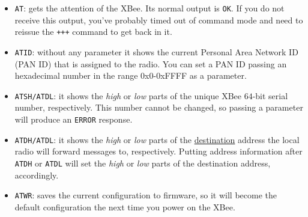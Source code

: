 \begin{itemize}
	\item \texttt{AT}: gets the attention of the XBee. Its normal output is \texttt{OK}. If you do not receive this output,  you've probably timed out of command mode and need to reissue the \texttt{+++} command to get back in it.
	\item \texttt{ATID}: without any parameter it shows the current Personal Area Network ID (PAN ID) that is assigned to the radio. You can set a PAN ID passing an hexadecimal number in the range $0$x$0$-$0$xFFFF as a parameter.
	\item \texttt{ATSH/ATDL}: it shows the \emph{high} or \emph{low} parts of the unique XBee $64$-bit serial number, respectively. This number cannot be changed, so passing a parameter will produce an \texttt{ERROR} response.
	\item \texttt{ATDH/ATDL}: it shows the \emph{high} or \emph{low} parts of the \underline{destination} address the local radio will forward messages to, respectively. Putting address information after \texttt{ATDH} or \texttt{ATDL} will set the \emph{high} or \emph{low} parts of the destination address, accordingly.
	\item \texttt{ATWR}: saves the current configuration to firmware, so it will become the default configuration the next time you power on the XBee.
\end{itemize}

		